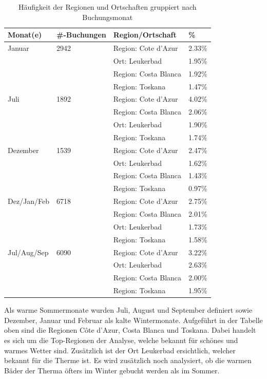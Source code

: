 \begin{table}[H] 
	\caption{Häufigkeit der Regionen und Ortschaften gruppiert nach Buchungsmonat}
	\centering
	\label{fig:testingfazit:testing:hypothesen:6}
	\begin{tabular}{ | l | l | l | l | } 
		\hline 
		\rowcolor{tableheadcolor}
		\bfseries Monat(e) & \bfseries \#-Buchungen & \bfseries Region/Ortschaft & \bfseries \% \\ \hline 
		Januar & 2942 & Region: Cote d'Azur & 2.33\% \\ \cline{3-4} 
		 & & Ort: Leukerbad & 1.95\% \\ \cline{3-4}
		 & & Region: Costa Blanca & 1.92\% \\ \cline{3-4}
		 & & Region: Toskana & 1.47\% \\ \hline
		 Juli & 1892 & Region: Cote d'Azur & 4.02\% \\ \cline{3-4} 
 		 & & Region: Costa Blanca & 2.06\% \\ \cline{3-4}
 		 & & Ort: Leukerbad & 1.90\% \\ \cline{3-4}
 		 & & Region: Toskana & 1.74\% \\ \hline
		 Dezember & 1539 & Region: Cote d'Azur & 2.47\% \\ \cline{3-4} 
		 & & Ort: Leukerbad & 1.62\% \\ \cline{3-4}
 		 & & Region: Costa Blanca & 1.43\% \\ \cline{3-4}
 		 & & Region: Toskana & 0.97\% \\ \hline
		 Dez/Jan/Feb & 6718 & Region: Cote d'Azur & 2.75\% \\ \cline{3-4} 
 		 & & Region: Costa Blanca & 2.01\% \\ \cline{3-4}
 		 & & Ort: Leukerbad & 1.73\% \\ \cline{3-4}
 		 & & Region: Toskana & 1.58\% \\ \hline
		 Jul/Aug/Sep & 6090 & Region: Cote d'Azur & 3.22\% \\ \cline{3-4} 
		 & & Ort: Leukerbad & 2.63\% \\ \cline{3-4}
 		 & & Region: Costa Blanca & 2.00\% \\ \cline{3-4}
 		 & & Region: Toskana & 1.95\% \\ \hline		 
	\end{tabular}
\end{table}

Als warme Sommermonate wurden Juli, August und September definiert sowie Dezember, Januar und Februar als kalte Wintermonate. Aufgeführt in der Tabelle oben sind die Regionen Côte d'Azur, Costa Blanca und Toskana. Dabei handelt es sich um die Top-Regionen der Analyse, welche bekannt für schönes und warmes Wetter sind. Zusätzlich ist der Ort Leukerbad ersichtlich, welcher bekannt für die Therme ist. Es wird zusätzlich noch analysiert, ob die warmen Bäder der Therma öfters im Winter gebucht werden als im Sommer.

